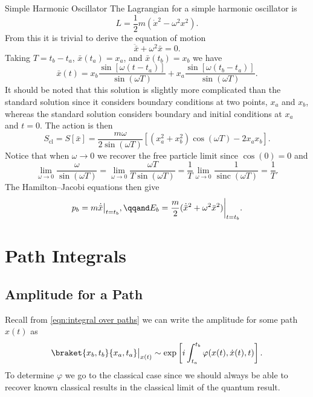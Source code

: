 \documentclass[fleqn]{NotesClass}
\newcommand*{\lagrangian}{L}
\newcommand*{\cl}{\mathrm{cl}}
\DeclareMathOperator{\sinc}{sinc}
\begin{document}
    \begin{exm}{Simple Harmonic Oscillator}{}
        The Lagrangian for a simple harmonic oscillator is
        \begin{equation}
            \lagrangian = \frac{1}{2}m(\dot{x}^2 - \omega^2x^2).
        \end{equation}
        From this it is trivial to derive the equation of motion
        \begin{equation}
            \ddot{\bar{x}} + \omega^2\bar{x} = 0.
        \end{equation}
        Taking \(T = t_b - t_a\), \(\bar{x}(t_a) = x_a\), and \(\bar{x}(t_b) = x_b\) we have
        \begin{equation}
            \bar{x}(t) = x_b\frac{\sin[\omega(t - t_a)]}{\sin(\omega T)} + x_a\frac{\sin[\omega(t_b - t_a)]}{\sin(\omega T)}.
        \end{equation}
        It should be noted that this solution is slightly more complicated than the standard solution since it considers boundary conditions at two points, \(x_a\) and \(x_b\), whereas the standard solution considers boundary and initial conditions at \(x_a\) and \(t = 0\).
        The action is then
        \begin{equation}
            S_{\cl} = S[\bar{x}] = \frac{m\omega}{2\sin(\omega T)} [(x_a^2 + x_b^2)\cos(\omega T) - 2x_ax_b].
        \end{equation}
        Notice that when \(\omega \to 0\) we recover the free particle limit since \(\cos(0) = 0\) and
        \begin{equation}
            \lim_{\omega \to 0} \frac{\omega}{\sin(\omega T)} = \lim_{\omega\to 0} \frac{\omega T}{T\sin(\omega T)} = \frac{1}{T}\lim_{\omega\to 0} \frac{1}{\sinc(\omega T)} = \frac{1}{T}.
        \end{equation}
        The Hamilton--Jacobi equations then give
        \begin{equation}
            p_b = m\dot{\bar{x}}\big\vert_{t=t_b}, \qqand E_b = \frac{m}{2}(\dot{\bar{x}}^2 + \omega^2\bar{x}^2)\bigg\vert_{t=t_b}.
        \end{equation}
    \end{exm}

    \chapter{Path Integrals}
    \section{Amplitude for a Path}
    Recall from \cref{eqn:integral over paths} we can write the amplitude for some path \(x(t)\) as
    \begin{equation}
        \braket{x_b, t_b}{x_a, t_a}\big\vert_{x(t)} \sim \exp\left[ i \int_{t_a}^{t_b} \varphi(x(t), \dot{x}(t), t) \right].
    \end{equation}
    To determine \(\varphi\) we go to the classical case since we should always be able to recover known classical results in the classical limit of the quantum result.
    
\end{document}
